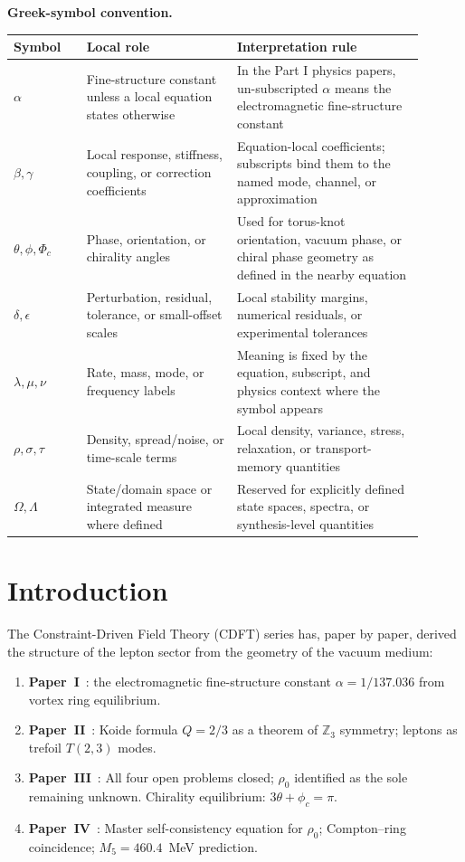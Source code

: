 \documentclass[11pt]{article}
\begin{document}
\noindent\textbf{Greek-symbol convention.}
\begin{center}
{\small
\begin{tabular}{p{0.16\linewidth}p{0.33\linewidth}p{0.41\linewidth}}
\hline
Symbol & Local role & Interpretation rule \\
\hline
$\alpha$ & Fine-structure constant unless a local equation states otherwise & In the Part I physics papers, un-subscripted $\alpha$ means the electromagnetic fine-structure constant \\
$\beta,\gamma$ & Local response, stiffness, coupling, or correction coefficients & Equation-local coefficients; subscripts bind them to the named mode, channel, or approximation \\
$\theta,\phi,\Phi_c$ & Phase, orientation, or chirality angles & Used for torus-knot orientation, vacuum phase, or chiral phase geometry as defined in the nearby equation \\
$\delta,\epsilon$ & Perturbation, residual, tolerance, or small-offset scales & Local stability margins, numerical residuals, or experimental tolerances \\
$\lambda,\mu,\nu$ & Rate, mass, mode, or frequency labels & Meaning is fixed by the equation, subscript, and physics context where the symbol appears \\
$\rho,\sigma,\tau$ & Density, spread/noise, or time-scale terms & Local density, variance, stress, relaxation, or transport-memory quantities \\
$\Omega,\Lambda$ & State/domain space or integrated measure where defined & Reserved for explicitly defined state spaces, spectra, or synthesis-level quantities \\
\hline
\end{tabular}
}
\end{center}


\section{Introduction}

The Constraint-Driven Field Theory (CDFT) series has, paper by paper,
derived the structure of the lepton sector from the geometry of the vacuum medium:

\begin{enumerate}
  \item \textbf{Paper~I}~\cite{MujjabiI2026}: the electromagnetic fine-structure
    constant $\alpha = 1/137.036$ from vortex ring
    equilibrium.
  \item \textbf{Paper~II}~\cite{MujjabiII2026}: Koide formula $Q = 2/3$ as a
    theorem of $\mathbb{Z}_3$ symmetry; leptons as trefoil $T(2,3)$ modes.
  \item \textbf{Paper~III}~\cite{MujjabiIII2026}: All four open problems closed;
    $\rho_0$ identified as the sole remaining unknown.
    Chirality equilibrium: $3\theta + \phi_c = \pi$.
  \item \textbf{Paper~IV}~\cite{MujjabiIV2026}: Master self-consistency equation
    for $\rho_0$; Compton--ring coincidence; $M_5 = 460.4$~MeV prediction.
\end{enumerate}
\end{document}
